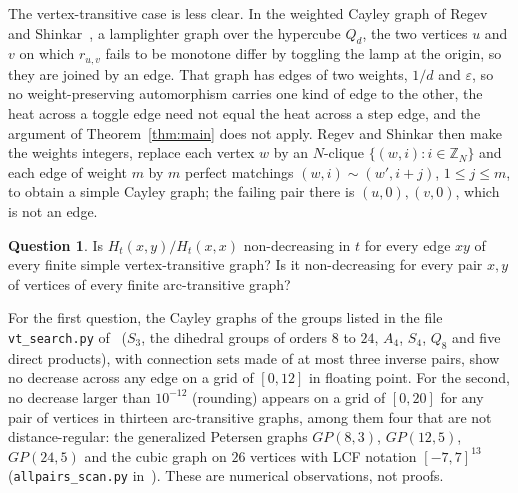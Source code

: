 \documentclass[11pt]{amsart}
\theoremstyle{definition}
\newtheorem{question}[theorem]{Question}
\theoremstyle{remark}
\begin{document}
The vertex-transitive case is less clear. In the weighted Cayley graph of Regev and Shinkar~\cite[Section~3]{RS}, a lamplighter graph over the hypercube $Q_d$, the two vertices $u$ and $v$ on which $r_{u,v}$ fails to be monotone differ by toggling the lamp at the origin, so they are joined by an edge. That graph has edges of two weights, $1/d$ and $\varepsilon$, so no weight-preserving automorphism carries one kind of edge to the other, the heat across a toggle edge need not equal the heat across a step edge, and the argument of Theorem~\ref{thm:main} does not apply. Regev and Shinkar then make the weights integers, replace each vertex $w$ by an $N$-clique $\{(w,i):i\in\mathbb Z_N\}$ and each edge of weight $m$ by $m$ perfect matchings $(w,i)\sim(w',i+j)$, $1\le j\le m$, to obtain a simple Cayley graph; the failing pair there is $(u,0),(v,0)$, which is not an edge.

\begin{question}
Is $H_t(x,y)/H_t(x,x)$ non-decreasing in $t$ for every edge $xy$ of every finite simple vertex-transitive graph? Is it non-decreasing for every pair $x,y$ of vertices of every finite arc-transitive graph?
\end{question}

For the first question, the Cayley graphs of the groups listed in the file \texttt{vt\_search.py} of~\cite{code} ($S_3$, the dihedral groups of orders $8$ to $24$, $A_4$, $S_4$, $Q_8$ and five direct products), with connection sets made of at most three inverse pairs, show no decrease across any edge on a grid of $[0,12]$ in floating point. For the second, no decrease larger than $10^{-12}$ (rounding) appears on a grid of $[0,20]$ for any pair of vertices in thirteen arc-transitive graphs, among them four that are not distance-regular: the generalized Petersen graphs $GP(8,3)$, $GP(12,5)$, $GP(24,5)$ and the cubic graph on $26$ vertices with LCF notation $[-7,7]^{13}$ (\texttt{allpairs\_scan.py} in~\cite{code}). These are numerical observations, not proofs.
\end{document}
